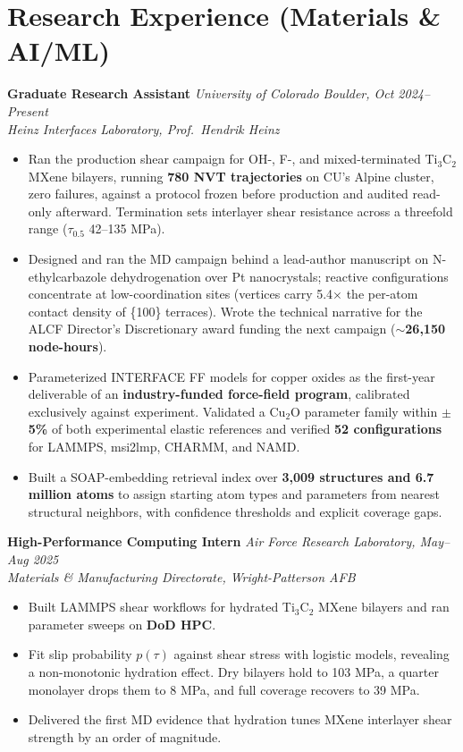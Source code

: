 \documentclass[letterpaper,10pt]{article}
\newcommand{\keep}{\needspace{4\baselineskip}}
\newcommand{\keepsection}{\needspace{6\baselineskip}}
\begin{document}
\keepsection\section*{Research Experience (Materials \& AI/ML)}
\textbf{Graduate Research Assistant} \hfill \textit{University of Colorado Boulder, Oct 2024--Present}\\
\textit{Heinz Interfaces Laboratory, Prof.\ Hendrik Heinz}
\begin{itemize}
    \item Ran the production shear campaign for OH-, F-, and mixed-terminated Ti\(_3\)C\(_2\) MXene bilayers, running \textbf{780 NVT trajectories} on CU's Alpine cluster, zero failures, against a protocol frozen before production and audited read-only afterward. Termination sets interlayer shear resistance across a threefold range (\(\tau_{0.5}\) 42--135 MPa).
    \item Designed and ran the MD campaign behind a lead-author manuscript on N-ethylcarbazole dehydrogenation over Pt nanocrystals; reactive configurations concentrate at low-coordination sites (vertices carry 5.4\(\times\) the per-atom contact density of \{100\} terraces). Wrote the technical narrative for the ALCF Director's Discretionary award funding the next campaign (\(\sim\)\textbf{26,150 node-hours}).
    \item Parameterized INTERFACE FF models for copper oxides as the first-year deliverable of an \textbf{industry-funded force-field program}, calibrated exclusively against experiment. Validated a Cu\(_2\)O parameter family within \textbf{\(\pm\)5\%} of both experimental elastic references and verified \textbf{52 configurations} for LAMMPS, msi2lmp, CHARMM, and NAMD.
    \item Built a SOAP-embedding retrieval index over \textbf{3,009 structures and 6.7 million atoms} to assign starting atom types and parameters from nearest structural neighbors, with confidence thresholds and explicit coverage gaps.
\end{itemize}

\keep\textbf{High-Performance Computing Intern} \hfill \textit{Air Force Research Laboratory, May--Aug 2025}\\
\textit{Materials \& Manufacturing Directorate, Wright-Patterson AFB}
\begin{itemize}
    \item Built LAMMPS shear workflows for hydrated Ti\(_3\)C\(_2\) MXene bilayers and ran parameter sweeps on \textbf{DoD HPC}.
    \item Fit slip probability \(p(\tau)\) against shear stress with logistic models, revealing a non-monotonic hydration effect. Dry bilayers hold to 103 MPa, a quarter monolayer drops them to 8 MPa, and full coverage recovers to 39 MPa.
    \item Delivered the first MD evidence that hydration tunes MXene interlayer shear strength by an order of magnitude.
\end{itemize}
\end{document}
